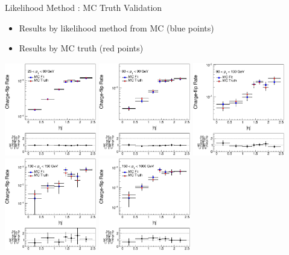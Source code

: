 \documentclass[mathserif,serif]{beamer}
\begin{document}
\begin{frame}{Likelihood Method : MC Truth Validation}
\begin{itemize}
\item Results by likelihood method from MC (blue points)
\item Results by MC truth (red points)
\end{itemize}
\includegraphics[width=0.3\textwidth]{data/plot/charge_flip/FitPlots/mc_cf_rate_0.eps}
\includegraphics[width=0.3\textwidth]{data/plot/charge_flip/FitPlots/mc_cf_rate_1.eps}
\includegraphics[width=0.3\textwidth]{data/plot/charge_flip/FitPlots/mc_cf_rate_2.eps} \\
\includegraphics[width=0.3\textwidth]{data/plot/charge_flip/FitPlots/mc_cf_rate_3.eps}
\includegraphics[width=0.3\textwidth]{data/plot/charge_flip/FitPlots/mc_cf_rate_4.eps}
\end{frame}
\end{document}
